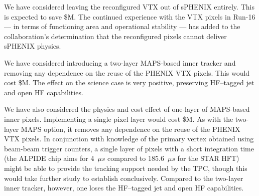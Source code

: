 We have considered leaving the reconfigured VTX out of sPHENIX
entirely.  This is expected to save \${\noVTX}M.  The continued experience
with the VTX pixels in Run-16 --- in terms of functioning area and
operational stability --- has added to the collaboration's
determination that the reconfigured pixels cannot deliver sPHENIX
physics. 

We have considered introducing a two-layer MAPS-based inner tracker
and removing any dependence on the reuse of the PHENIX VTX pixels.
This would cost \${\twoLayerMAPS}M.  The effect on the science case is very
positive, preserving HF--tagged jet and open HF capabilities. 

We have also considered the physics and cost effect of one-layer of
MAPS-based inner pixels.  Implementing a single pixel layer would cost
\${\oneLayerMAPS}M.  As with the two-layer MAPS option, it removes any
dependence on the reuse of the PHENIX VTX pixels.  In conjunction with
knowledge of the primary vertex obtained using beam-beam trigger
counters, a single layer of pixels with a short integration time (the
ALPIDE chip aims for 4~$\mu s$ compared to 185.6~$\mu s$ for the STAR
HFT) might be able to provide the tracking support needed by the TPC,
though this would take further study to establish conclusively.
Compared to the two-layer inner tracker, however, one loses the
HF--tagged jet and open HF capabilities.






